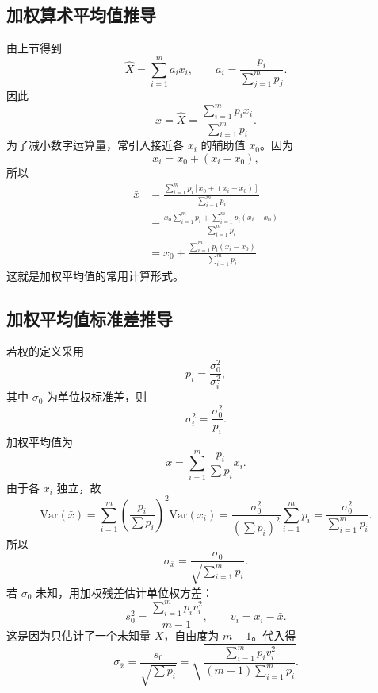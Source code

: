 \documentclass[UTF8,12pt,a4paper]{ctexart}
\newcommand{\Var}{\mathrm{Var}}
\begin{document}
\subsection{加权算术平均值推导}
由上节得到
\begin{equation*}
    \hat{X}=\sum_{i=1}^{m}a_i x_i,
    \qquad
    a_i=\frac{p_i}{\sum_{j=1}^{m}p_j} .
\end{equation*}
因此
\begin{equation*}
    \bar{x}=\hat{X}=\frac{\sum_{i=1}^{m}p_i x_i}{\sum_{i=1}^{m}p_i} .
\end{equation*}
为了减小数字运算量，常引入接近各 $x_i$ 的辅助值 $x_0$。因为
\begin{equation*}
    x_i=x_0+(x_i-x_0),
\end{equation*}
所以
\begin{equation*}
\begin{aligned}
    \bar{x}
    &=\frac{\sum_{i=1}^{m}p_i\left[x_0+(x_i-x_0)\right]}{\sum_{i=1}^{m}p_i} \\
    &=\frac{x_0\sum_{i=1}^{m}p_i+\sum_{i=1}^{m}p_i(x_i-x_0)}{\sum_{i=1}^{m}p_i} \\
    &=x_0+\frac{\sum_{i=1}^{m}p_i(x_i-x_0)}{\sum_{i=1}^{m}p_i} .
\end{aligned}
\end{equation*}
这就是加权平均值的常用计算形式。

\newpage

\subsection{加权平均值标准差推导}
若权的定义采用
\begin{equation*}
    p_i=\frac{\sigma_0^2}{\sigma_i^2},
\end{equation*}
其中 $\sigma_0$ 为单位权标准差，则
\begin{equation*}
    \sigma_i^2=\frac{\sigma_0^2}{p_i} .
\end{equation*}
加权平均值为
\begin{equation*}
    \bar{x}=\sum_{i=1}^{m}\frac{p_i}{\sum p_i}x_i .
\end{equation*}
由于各 $x_i$ 独立，故
\begin{equation*}
    \Var(\bar{x})=\sum_{i=1}^{m}\left(\frac{p_i}{\sum p_i}\right)^2\Var(x_i)=\frac{\sigma_0^2}{(\sum p_i)^2}\sum_{i=1}^{m}p_i=\frac{\sigma_0^2}{\sum_{i=1}^{m}p_i}.
\end{equation*}
所以
\begin{equation*}
    \sigma_{\bar{x}}=\frac{\sigma_0}{\sqrt{\sum_{i=1}^{m}p_i}} .
\end{equation*}
若 $\sigma_0$ 未知，用加权残差估计单位权方差：
\begin{equation*}
    s_0^2=\frac{\sum_{i=1}^{m}p_i v_i^2}{m-1},
    \qquad
    v_i=x_i-\bar{x} .
\end{equation*}
这是因为只估计了一个未知量 $X$，自由度为 $m-1$。代入得
\begin{equation*}
    \sigma_{\bar{x}}
    =\frac{s_0}{\sqrt{\sum p_i}}
    =\sqrt{\frac{\sum_{i=1}^{m}p_i v_i^2}{(m-1)\sum_{i=1}^{m}p_i}} .
\end{equation*}
\end{document}
